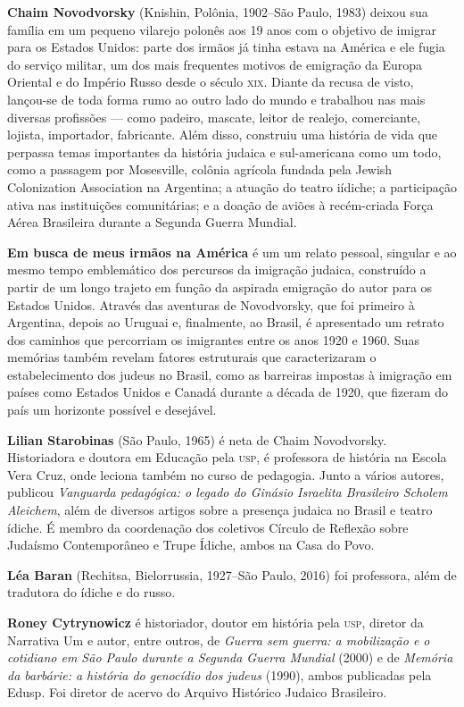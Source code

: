 \textbf{Chaim Novodvorsky} (Knishin, Polônia, 1902--São Paulo, 1983) deixou sua família em um pequeno vilarejo polonês aos 19 anos com o objetivo de imigrar para os Estados Unidos: parte dos irmãos já tinha estava na América e ele fugia do serviço militar, um dos mais frequentes motivos de emigração da Europa Oriental e do Império Russo desde o século \textsc{xix}. Diante da recusa de visto, lançou-se de toda forma rumo ao outro lado do mundo e trabalhou nas mais diversas profissões --- como padeiro, mascate, leitor de realejo, comerciante, lojista, importador, fabricante. Além disso, construiu uma história de vida que perpassa temas importantes da história judaica e sul-americana como um todo, como a passagem por Mosesville, colônia agrícola fundada pela Jewish Colonization Association na Argentina; a atuação do teatro iídiche; a participação ativa nas instituições comunitárias; e a doação de aviões à recém-criada Força Aérea Brasileira durante a Segunda Guerra Mundial.

\textbf{Em busca de meus irmãos na América} é um um relato pessoal, singular e ao mesmo tempo emblemático dos percursos da imigração judaica, construído a partir de um longo trajeto em função da aspirada emigração do autor para os Estados Unidos. Através das aventuras de Novodvorsky, que foi primeiro à Argentina, depois ao Uruguai e, finalmente, ao Brasil, é apresentado um retrato dos caminhos que percorriam os imigrantes entre os anos 1920 e 1960. Suas memórias também revelam fatores estruturais que caracterizaram o estabelecimento dos judeus no Brasil, como as barreiras impostas à imigração em países como Estados Unidos e Canadá durante a década de 1920, que fizeram do país um horizonte possível e desejável.

\pagebreak

\textbf{Lilian Starobinas} (São Paulo, 1965) é neta de Chaim Novodvorsky. Historiadora e doutora em Educação pela \textsc{usp}, é professora de história na Escola Vera Cruz, onde leciona também no curso de pedagogia. Junto a vários autores, publicou \textit{Vanguarda pedagógica: o legado do Ginásio Israelita Brasileiro Scholem Aleichem}, além de diversos artigos sobre a presença judaica no Brasil e teatro ídiche. É membro da coordenação dos coletivos Círculo de Reflexão sobre Judaísmo Contemporâneo e Trupe Ídiche, ambos na Casa do Povo. 

\textbf{Léa Baran} (Rechitsa, Bielorrussia, 1927--São Paulo, 2016) foi professora, além de tradutora do ídiche e do russo.

\textbf{Roney Cytrynowicz} é historiador, doutor em história pela \textsc{usp}, diretor da Narrativa Um e autor, entre outros, de \textit{Guerra sem guerra: a mobilização e o cotidiano em São Paulo durante a Segunda Guerra Mundial} (2000) e de \textit{Memória da barbárie: a história do genocídio dos judeus} (1990), ambos publicadas pela Edusp. Foi diretor de acervo do Arquivo Histórico Judaico Brasileiro.




